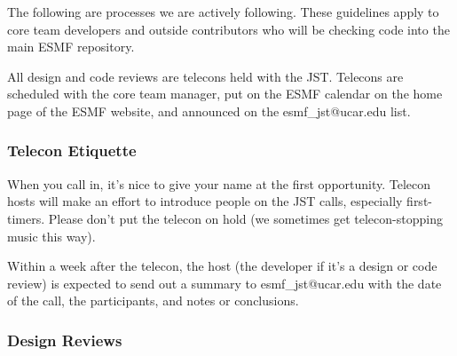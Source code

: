 The following are processes we are actively following.  These
guidelines apply to core team developers and outside contributors
who will be checking code into the main ESMF repository.

All design and code reviews are telecons held with the JST. 
Telecons are scheduled with the core team manager, put on the ESMF
calendar on the home page of the ESMF website, and announced on the
esmf\_jst@ucar.edu list.

\subsubsection{Telecon Etiquette}

When you call in, it's nice to give your name at the first opportunity.
Telecon hosts will make an effort to introduce people on the JST calls,
especially first-timers. Please don't put the telecon on hold (we sometimes
get telecon-stopping music this way).

Within a week after the telecon, the host (the developer if it's a design
or code review) is expected to send out a summary to esmf\_jst@ucar.edu
with the date of the call, the participants, and notes or conclusions.

\subsubsection{Design Reviews}

